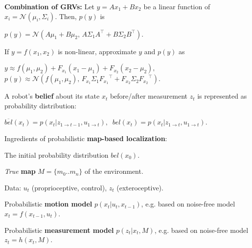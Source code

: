 \documentclass[landscape]{article}
\newcommand{\vmspace}{\vspace{-7pt}}
\newcommand{\vpspace}{\vspace{5pt}}
\begin{document}
\begin{multicols}{3}
\begin{minipage}{\columnwidth}
  \textbf{Combination of GRVs:} Let $y=Ax_1 + Bx_2$ be a linear function of
  $x_i=\mathcal N(\mu_i, \Sigma_i)$. Then, $p(y)$ is
  \vmspace
  \begin{center}
    $
    p(y) = \mathcal N (A\mu_1 + B\mu_2,\,
    A\Sigma_1A^\intercal + B\Sigma_2B^\intercal).
    $
  \end{center}
  \vmspace
  If $y=f(x_1,x_2)$ is non-linear, approximate $y$ and $p(y)$ as
  \vmspace
  \begin{center}
    $
    y \approx f(\mu_1, \mu_2) + F_{x_1} (x_1 - \mu_1) + F_{x_2}(x_2 -
    \mu_2),\;\;$\\
    $p(y) \approx \mathcal N(f(\mu_1, \mu_2),\,
    F_{x_1}\Sigma_1{F_{x_1}}^\intercal +
    F_{x_2}\Sigma_2{F_{x_2}}^\intercal).
    $
  \end{center}
\end{minipage}

\vpspace

\begin{minipage}{\columnwidth}
  A robot's \textbf{belief} about its state $x_t$ before/after measurement $z_t$
  is represented as probability distribution:
  \vmspace
  \begin{center}
    $
    \overline{bel}(x_t)
    =
    p(x_t | z_{1 \rightarrow t-1}, u_{1 \rightarrow t}),\;\;
    bel(x_t)
    =
    p(x_t | z_{1 \rightarrow t}, u_{1 \rightarrow t}).
    $
  \end{center}
\end{minipage}

\vpspace

\begin{minipage}{\columnwidth}
  Ingredients of probabilistic \textbf{map-based localization}:
  \begin{compactenum}
  \item The initial probability distribution $bel(x_0)$.
  \item \textit{True} \textbf{map} $M = \{m_0.. m_n\}$ of the environment.
  \item Data: $u_t$ (proprioceptive, control), $z_t$ (exteroceptive).
  \item Probabilistic \textbf{motion model} $p(x_t|u_t, x_{t-1})$, e.g. based on
    noise-free model $x_t = f(x_{t-1}, u_t)$.
  \item Probabilistic \textbf{measurement model} $p(z_t|x_t,M)$, e.g. based on
    noise-free model $z_t = h(x_t, M)$.
  \end{compactenum}
\end{minipage}


\end{multicols}
\end{document}

